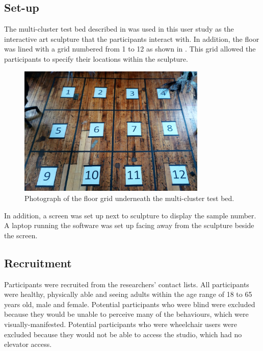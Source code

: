 \subsection{Set-up}

The multi-cluster test bed described in  was used in this user study as the interactive art sculpture that the participants interact with. In addition, the floor was lined with a grid numbered from 1 to 12 as shown in . This grid allowed the participants to specify their locations within the sculpture.  

\begin{figure} [!htbp]
	\centering
	\includegraphics[width=0.8\textwidth]{"fig/validations/cbla-test-bed gird photo"}
	\caption[Photograph of the floor grid underneath the multi-cluster test bed]{Photograph of the floor grid underneath the multi-cluster test bed.}
	\label{fig:cbla-test-bed gird photo}
\end{figure}

In addition, a screen was set up next to sculpture to display the sample number. A laptop running the software was set up facing away from the sculpture beside the screen. 


\subsection{Recruitment}

Participants were recruited from the researchers' contact lists. All participants were healthy, physically able and seeing adults within the age range of 18 to 65 years old, male and female. Potential participants who were blind were excluded because they would be unable to perceive many of the behaviours, which were visually-manifested. Potential participants who were wheelchair users were excluded because they would not be able to access the studio, which had no elevator access.

